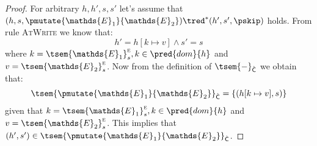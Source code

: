 \begin{lem}
{\begin{proof}
	For arbitrary $h, h', s, s'$ let's assume that $(h, s, \pmutate{\mathds{E}_1}{\mathds{E}_2}) \tred^* (h', s', \pskip)$ holds. From rule \textsc{AtWrite} we know that:
	\[
		h' = h[k \mapsto v] \land s' = s
	\]
	where $k = \tsem{\mathds{E}_1}^\textsc{e}_s, k \in \pred{dom}{h}$ and $v = \tsem{\mathds{E}_2}^\textsc{e}_s$. Now from  the definition of $\tsem{-}_{\hat{\mathsf{C}}}$ we obtain that:
	\[
		\tsem{\pmutate{\mathds{E}_1}{\mathds{E}_2}}_{\hat{\mathsf{C}}} = \{ (h[k \mapsto v], s) \}
	\]
	given that $k = \tsem{\mathds{E}_1}^\textsc{e}_s, k \in \pred{dom}{h}$ and $v = \tsem{\mathds{E}_2}^\textsc{e}_s$. This implies that $(h', s') \in \tsem{\pmutate{\mathds{E}_1}{\mathds{E}_2}}_{\hat{\mathsf{C}}}$.
	\end{proof}
	}
\end{lem}